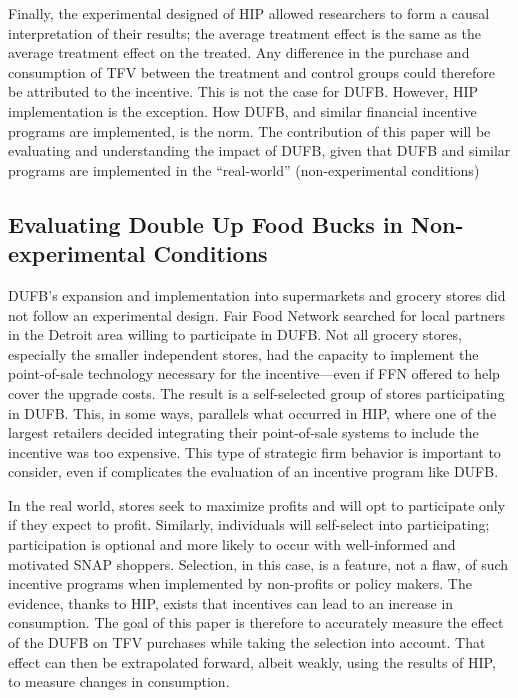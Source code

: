 \documentclass[12pt,letterpaperpaper,]{book}
\begin{document}
Finally, the experimental designed of HIP allowed researchers to form a
causal interpretation of their results; the average treatment effect is
the same as the average treatment effect on the treated. Any difference
in the purchase and consumption of TFV between the treatment and control
groups could therefore be attributed to the incentive. This is not the
case for DUFB. However, HIP implementation is the exception. How DUFB,
and similar financial incentive programs are implemented, is the norm.
The contribution of this paper will be evaluating and understanding the
impact of DUFB, given that DUFB and similar programs are implemented in
the ``real-world'' (non-experimental conditions)

\subsection*{Evaluating Double Up Food Bucks in Non-experimental
Conditions}\label{evaluating-double-up-food-bucks-in-non-experimental-conditions}

DUFB's expansion and implementation into supermarkets and grocery stores
did not follow an experimental design. Fair Food Network searched for
local partners in the Detroit area willing to participate in DUFB. Not
all grocery stores, especially the smaller independent stores, had the
capacity to implement the point-of-sale technology necessary for the
incentive---even if FFN offered to help cover the upgrade costs. The
result is a self-selected group of stores participating in DUFB. This,
in some ways, parallels what occurred in HIP, where one of the largest
retailers decided integrating their point-of-sale systems to include the
incentive was too expensive. This type of strategic firm behavior is
important to consider, even if complicates the evaluation of an
incentive program like DUFB.

In the real world, stores seek to maximize profits and will opt to
participate only if they expect to profit. Similarly, individuals will
self-select into participating; participation is optional and more
likely to occur with well-informed and motivated SNAP shoppers.
Selection, in this case, is a feature, not a flaw, of such incentive
programs when implemented by non-profits or policy makers. The evidence,
thanks to HIP, exists that incentives can lead to an increase in
consumption. The goal of this paper is therefore to accurately measure
the effect of the DUFB on TFV purchases while taking the selection into
account. That effect can then be extrapolated forward, albeit weakly,
using the results of HIP, to measure changes in consumption.
\end{document}
